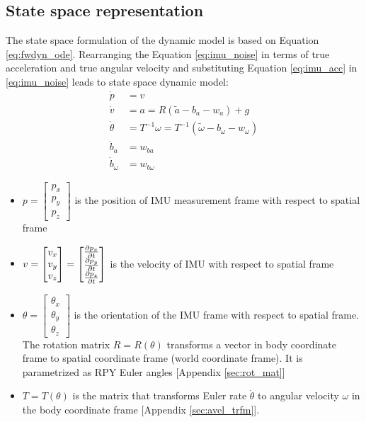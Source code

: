\subsection{State space representation}
The state space formulation of the dynamic model is based on Equation \ref{eq:fwdyn_ode}. Rearranging the Equation \ref{eq:imu_noise} in terms of true acceleration and true angular velocity and substituting Equation \ref{eq:imu_acc} in \ref{eq:imu_noise} leads to state space dynamic model: 
\begin{equation}
    \label{eq:dyn_imu}
    \begin{split}
    \dot{p} &= v \\
    \dot{v} &= a = R(\tilde{a} - b_a - w_a)+g \\
    \dot{\theta} &= T^{-1}\omega = T^{-1}(\tilde{\omega} - b_\omega - w_\omega) \\
    \dot{b}_a &= w_{ba}\\
    \dot{b}_\omega &= w_{b\omega}
    \end{split}
\end{equation}
\begin{itemize}
    \item $ p = \begin{bmatrix} p_x \\ p_y \\ p_z \end{bmatrix}$ is the position of IMU measurement frame with respect to spatial frame
    \item $ v = \begin{bmatrix} v_x \\ v_y \\ v_z \end{bmatrix} = \begin{bmatrix} \frac{\partial {p_x}}{\partial {t}} \\ \frac{\partial {p_y}}{\partial {t}} \\ \frac{\partial {p_z}}{\partial {t}} \end{bmatrix}$ is the velocity of IMU with respect to spatial frame
    \item $ \theta = \begin{bmatrix} \theta_x \\ \theta_y \\ \theta_z \end{bmatrix}$ is the orientation of the IMU frame with respect to spatial frame. The rotation matrix $R=R(\theta)$ transforms a vector in body coordinate frame to spatial coordinate frame (world coordinate frame). It is parametrized as RPY Euler angles [Appendix \ref{sec:rot_mat}]
    \item $T=T(\theta)$ is the matrix that transforms Euler rate $\dot{\theta}$ to angular velocity $\omega$ in the body coordinate frame [Appendix \ref{sec:avel_trfm}].
\end{itemize}
